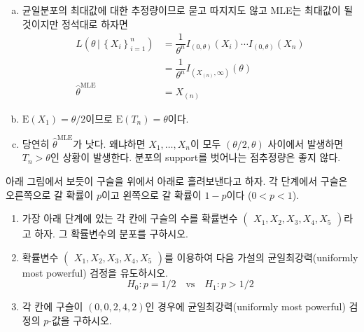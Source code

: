 \documentclass[answers]{exam}
\begin{document}
\begin{questions}
\begin{enumerate}[(a)]
   \end{enumerate}
   \begin{solution}
    \begin{enumerate}[(a)]
      \item 균일분포의 최대값에 대한 추정량이므로 묻고 따지지도 않고 MLE는 최대값이 될 것이지만 정석대로 하자면
      \begin{align}
        L\left(\theta\,|\,\left\{X_{i}\right\}_{i=1}^{n}\right) &= \dfrac{1}{\theta^{n}}I_{\left(0,\theta\right)}\left(X_{i}\right)\cdots I_{\left(0,\theta\right)}\left(X_{n}\right)\\
        &=\dfrac{1}{\theta^{n}}I_{\left(X_{\left(n\right)},\infty\right)}\left(\theta\right)\\
        \widehat{\theta}^{\text{MLE}} &= X_{\left(n\right)}
      \end{align}
      \item $\mathrm{E}\left(X_{1}\right)=\theta/2$이므로 $\mathrm{E}\left(T_{n}\right)=\theta$이다.
      \item 당연히 $\widehat{\theta}^{\text{MLE}}$가 낫다. 왜냐하면 $X_{1},\ldots,X_{n}$이 모두 $\left(\theta/2,\theta\right)$ 사이에서 발생하면 $T_{n}>\theta$인 상황이 발생한다. 분포의 support를 벗어나는 점추정량은 좋지 않다.
    \end{enumerate}
   \end{solution}
   \question
   아래 그림에서 보듯이 구슬을 위에서 아래로 흘려보낸다고 하자. 각 단계에서 구슬은 오른쪽으로 갈 확률이 $p$이고 왼쪽으로 갈 확률이 $1-p$이다 ($0<p<1$).
   \begin{enumerate}[(1)]
    \item 가장 아래 단계에 있는 각 칸에 구슬의 수를 확률변수 $\begin{pmatrix}X_{1},X_{2},X_{3},X_{4},X_{5}\end{pmatrix}$라고 하자. 그 확률변수의 분포를 구하시오.
    \item 확률변수 $\begin{pmatrix}X_{1},X_{2},X_{3},X_{4},X_{5}\end{pmatrix}$를 이용하여 다음 가설의 균일최강력(uniformly most powerful) 검정을 유도하시오.
    \begin{equation}
      H_{0}: p=1/2\quad \text{vs}\quad H_{1}:p>1/2
    \end{equation}
    \item 각 칸에 구슬이 $(0,0,2,4,2)$인 경우에 균일최강력(uniformly most powerful) 검정의 $p$-값을 구하시오.
   \end{enumerate}
   \begin{solution}

\end{solution}
\end{questions}
\end{document}

